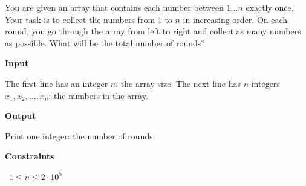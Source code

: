 You are given an array that contains each number between $1 \dots n$ exactly once. Your task is to collect the numbers from $1$ to $n$ in increasing order.
On each round, you go through the array from left to right and collect as many numbers as possible. What will be the total number of rounds?

\vspace{0.3cm}\noindent\textbf{Input}

The first line has an integer $n$: the array size.
The next line has $n$ integers $x_1,x_2,\dots,x_n$: the numbers in the array.

\vspace{0.3cm}\noindent\textbf{Output}

Print one integer: the number of rounds.

\vspace{0.3cm}\noindent\textbf{Constraints}

\textbullet\ $1 \le n \le 2 \cdot 10^5$